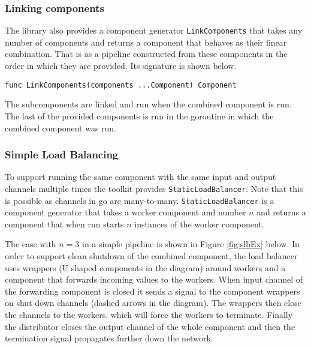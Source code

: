 \subsubsection{Linking components}
The library also provides a component generator \texttt{LinkComponents} that takes 
any number of components and returns a component that behaves as their 
linear combination. That is as a pipeline constructed from these components 
in the order in which they are provided. Its signature is shown below.
\begin{lstlisting}
func LinkComponents(components ...Component) Component
\end{lstlisting}
The subcomponents are linked and run when the combined component is run. 
The last of the provided components is run in the goroutine in which
the combined component was run.

\subsubsection{Simple Load Balancing}
To support running the same component with the same input and output 
channels multiple times the toolkit provides \texttt{StaticLoadBalancer}.
Note that this is possible as channels in go are many-to-many.
\texttt{StaticLoadBalancer} is a component generator that takes a worker 
component and number $n$ and returns a component that when run starts 
$n$ instances of the worker component. 

The case with $n=3$ in a simple pipeline is shown in Figure \ref{fig:slbEx} below. 
In order to support clean shutdown of the combined component, the load balancer uses 
wrappers (U shaped components in the diagram) around workers and a component that 
forwards incoming values to the workers. When input channel of the forwarding
component is closed it sends a signal to the component wrappers on shut 
down channels (dashed arrows in the diagram). The wrappers then close
the channels to the workers, which will force the workers to terminate.
Finally the distributor closes the output channel of the whole component
and then the termination signal propagates further down the network.

